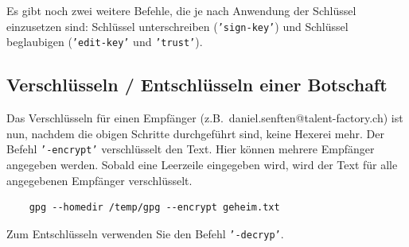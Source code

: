 Es gibt noch zwei weitere Befehle, die je nach Anwendung der Schlüssel einzusetzen
sind: Schlüssel unterschreiben (\texttt{'sign-key'}) und Schlüssel beglaubigen
(\texttt{'edit-key'} und \texttt{'trust'}).

\subsection{Verschlüsseln / Entschlüsseln einer Botschaft}
\label{subsec:gpg-encrypt-decrypt}


Das Verschlüsseln für einen Empfänger (z.B.~daniel.senften@talent-factory.ch) ist nun,
nachdem die obigen Schritte durchgeführt sind, keine Hexerei mehr. Der Befehl
\texttt{'-encrypt'} verschlüsselt den Text. Hier können mehrere Empfänger angegeben
werden. Sobald eine Leerzeile eingegeben wird, wird der Text für alle angegebenen
Empfänger verschlüsselt.

\begin{verbatim}
    gpg --homedir /temp/gpg --encrypt geheim.txt
\end{verbatim}

Zum Entschlüsseln verwenden Sie den Befehl \texttt{'-decryp'}.


